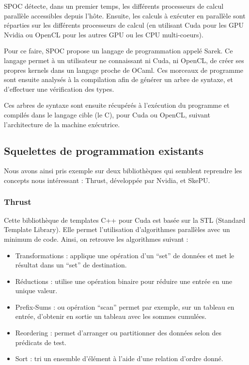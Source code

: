 \documentclass{report}
\begin{document}
SPOC détecte, dans un premier temps, les différents processeurs de calcul parallèle accessibles depuis l'hôte.\newline
Ensuite, les calculs à exécuter en parallèle sont réparties sur les différents processeurs de calcul (en utilisant Cuda pour les GPU Nvidia ou OpenCL pour les autres GPU ou les CPU multi-coeurs). \newline

Pour ce faire, SPOC propose un langage de programmation appelé Sarek. Ce langage permet à un utilisateur ne connaissant ni Cuda, ni OpenCL, de créer ses propres kernels dans un langage proche de OCaml. Ces morceaux de programme sont ensuite analysés à la compilation afin de générer un arbre de syntaxe, et d'effectuer une vérification des types.\newline

Ces arbres de syntaxe sont ensuite récupérés à l'exécution du programme et compilés dans le langage cible (le C), pour Cuda ou OpenCL, suivant l'architecture de la machine exécutrice. \newline

\subsection{Squelettes de programmation existants}

Nous avons ainsi pris exemple sur deux bibliothèques qui semblent reprendre les concepts nous intéressant : Thrust, développée par Nvidia, et SkePU.

\subsubsection{Thrust}

Cette bibliothèque de templates C++ pour Cuda est basée sur la STL (Standard Template Library). Elle permet l’utilisation d’algorithmes parallèles avec un minimum de code. Ainsi, on retrouve les algorithmes suivant :

\begin{itemize}
\item Transformations : applique une opération d’un “set” de données et met le résultat dans un “set” de destination. 
\item Réductions : utilise une opération binaire pour réduire une entrée en une unique valeur. 
\item Prefix-Sums : ou opération “scan” permet par exemple, sur un tableau en entrée, d’obtenir en sortie un tableau avec les sommes cumulées.
\item Reordering : permet d’arranger ou partitionner des données selon des prédicats de test.
\item Sort : tri un ensemble d’élément à l’aide d’une relation d’ordre donné.
\end{itemize}
\end{document}

